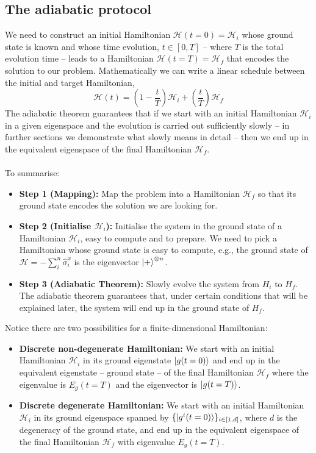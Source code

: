 \subsection{The adiabatic protocol}
We need to construct an initial Hamiltonian $\mathcal{H}(t=0) = \mathcal{H}_{i}$ whose ground state is known and whose time evolution, $t \in \left[0,T\right]$ -- where $T$ is the total evolution time -- leads to a Hamiltonian $\mathcal{H}(t=T) = \mathcal{H}_{f}$ that encodes the solution to our problem. Mathematically we can write a linear schedule between the initial and target Hamiltonian,
\begin{equation}
\label{eq:Htime}
    \mathcal{H}(t) = \left(1-\frac{t}{T}\right)\mathcal{H}_{i} + \left(\frac{t}{T} \right)\mathcal{H}_{f}
\end{equation}
The adiabatic theorem guarantees that if we start with an initial Hamiltonian $\mathcal{H}_{i}$ in a given eigenspace and the evolution is carried out sufficiently slowly -- in further sections we demonstrate what slowly means in detail -- then we end up in the equivalent eigenspace of the final Hamiltonian $\mathcal{H}_{f}$. \\\\
To summarise:
\begin{itemize}
    \item \textbf{Step 1 (Mapping):} Map the problem into a Hamiltonian  $\mathcal{H}_{f}$ so that its ground state encodes the solution we are looking for.
    \item \textbf{Step 2 (Initialise $\mathcal{H}_{i}$):} Initialise the system in the ground state of a Hamiltonian $\mathcal{H}_{i}$, easy to compute and to prepare. We need to pick a Hamiltonian whose ground state is easy to compute, e.g., the ground state of $\mathcal{H} = - \sum_{i}^{n}\hat{\sigma}_{i}^{x}$ is the eigenvector $\ket{+}^{\otimes n}$.
    \item \textbf{Step 3 (Adiabatic Theorem):} Slowly evolve the system from $H_{i}$ to $H_{f}$. The adiabatic theorem guarantees that, under certain conditions that will be explained later, the system will end up in the ground state of $H_{f}$.
\end{itemize}
Notice there are two possibilities for a finite-dimensional Hamiltonian:
\begin{itemize}
    \item \textbf{Discrete non-degenerate Hamiltonian:} We start with an initial Hamiltonian $\mathcal{H}_{i}$ in its ground eigenstate $\ket{g(t=0)}$ and end up in the equivalent eigenstate -- ground state -- of the final Hamiltonian $\mathcal{H}_{f}$ where the eigenvalue is $E_{g}(t=T)$ and the eigenvector is $\ket{g(t=T)}$.
    \item \textbf{Discrete degenerate Hamiltonian:} We start with an initial Hamiltonian $\mathcal{H}_{i}$ in its ground eigenspace spanned by $\{\ket{g^{i}(t=0)}\}_{i \in \left[1,d\right]}$, where $d$ is the degeneracy of the ground state, and end up in the equivalent eigenspace of the final Hamiltonian $\mathcal{H}_{f}$ with eigenvalue $E_{g}(t=T)$.
\end{itemize}
